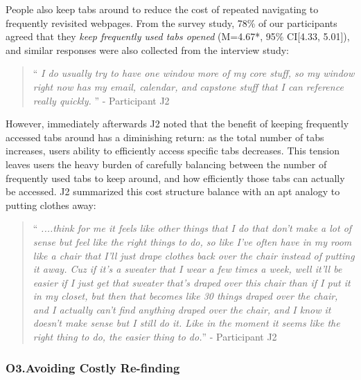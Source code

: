 People also keep tabs around to reduce the cost of repeated navigating to frequently revisited webpages. From the survey study, 78\% of our participants agreed that they \emph{keep frequently used tabs opened} (M=4.67*, 95\% CI[4.33, 5.01]), and similar responses were also collected from the interview study:


\begin{quote}
``\emph{ I do usually try to have one window more of my core stuff, so my window right now has my email, calendar, and capstone stuff that I can reference really quickly. }'' - Participant J2
\end{quote}

However, immediately afterwards J2 noted that the benefit of keeping frequently accessed tabs around has a diminishing return: as the total number of tabs increases, users ability to efficiently access specific tabs decreases. This tension leaves users the heavy burden of carefully balancing between the number of frequently used tabs to keep around, and how efficiently those tabs can actually be accessed. J2 summarized this cost structure balance with an apt analogy to putting clothes away:

\begin{quote}
``\emph{
....think for me it feels like other things that I do that don't make a lot of sense but feel like the right things to do, so like I've often have in my room like a chair that I'll just drape clothes back over the chair instead of putting it away. Cuz if it's a sweater that I wear a few times a week, well it'll be easier if I just get that sweater that's draped over this chair than if I put it in my closet, but then that becomes like 30 things draped over the chair, and I actually can't find anything draped over the chair, and I know it doesn't make sense but I still do it. Like in the moment it seems like the right thing to do, the easier thing to do.}'' - Participant J2
\end{quote}



\subsubsection{O3.Avoiding Costly Re-finding}

